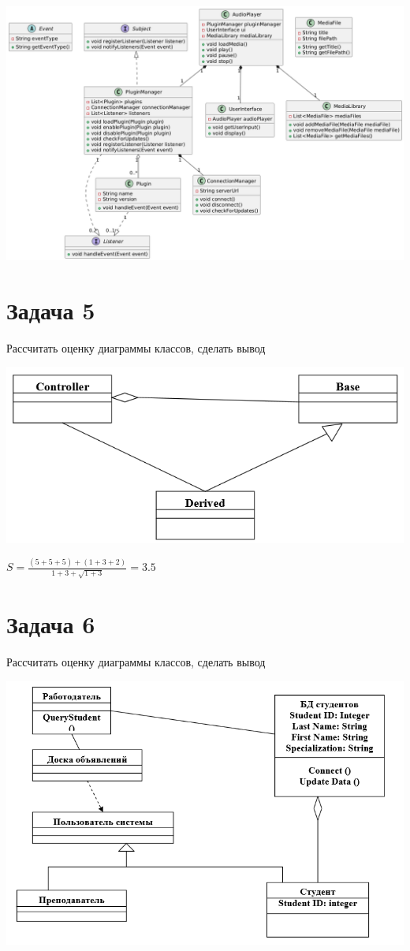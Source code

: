 \documentclass{article}
\begin{document}
\includegraphics[width=\textwidth]{4.png}

\section{Задача 5}
Рассчитать оценку диаграммы классов, сделать вывод


\includegraphics[width=\textwidth]{task5.png}

$ S = \frac{(5 + 5 + 5) + (1 + 3 + 2)}{1 + 3 + \sqrt{1 + 3}} = 3.5 $

\section{Задача 6}
Рассчитать оценку диаграммы классов, сделать вывод

\includegraphics[width=\textwidth]{task6.png}
\end{document}
